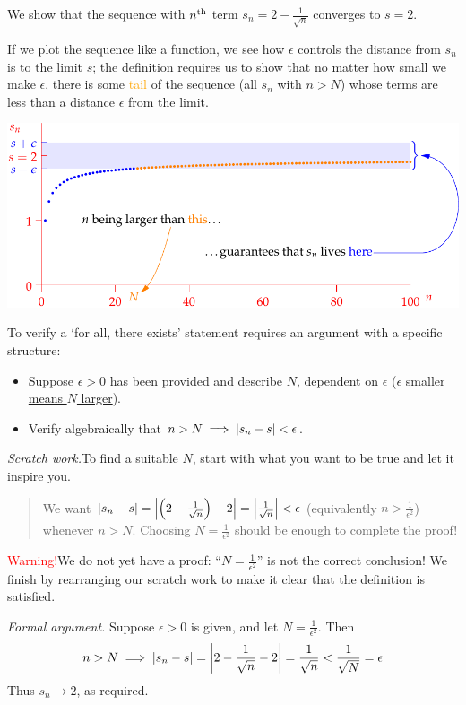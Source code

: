 \goodbreak


\begin{example}{}{}
We show that the sequence with $n\textsuperscript{th}$ term $s_n=2-\frac 1{\sqrt n}$ converges to $s=2$.\smallbreak

If we plot the sequence like a function, we see how $\epsilon$ controls the distance from $s_n$ is to the limit $s$; the definition requires us to show that no matter how small we make $\epsilon$, there is some \textcolor{orange}{tail} of the sequence (all $s_n$ with $n>N$) whose terms are less than a distance $\epsilon$ from the limit.\vspace{-5pt}

\begin{center}
\includegraphics[scale=0.9]{limitdef-pic}\vspace{-8pt}
\end{center}

To verify a `for all, there exists' statement requires an argument with a specific structure:
\begin{itemize}\itemsep0pt
  \item Suppose $\epsilon>0$ has been provided and describe $N$, dependent on $\epsilon$ (\href{http://www.math.uci.edu/~ndonalds/math140a/limitdefanim.html}{$\epsilon$ smaller means $N$ larger}).
  \item Verify algebraically that $n>N\implies\left| s_n-s\right|<\epsilon$.
\end{itemize}

\emph{Scratch work.}\quad To find a suitable $N$, start with what you want to be true and let it inspire you.
\begin{quote}
We want $\left| s_n-s\right|=\left| \left(2-\frac 1{\sqrt n}\right)-2\right| =\left| \frac 1{\sqrt n}\right|<\epsilon$ (equivalently $n>\frac 1{\epsilon^2}$) whenever $n>N$. Choosing $N=\frac 1{\epsilon^2}$ should be enough to complete the proof!
\end{quote}
\textcolor{red}{Warning!}\quad We do not yet have a proof: ``$N=\frac 1{\epsilon^2}$'' is not the correct conclusion! We finish by rearranging our scratch work to make it clear that the definition is satisfied.\medbreak

\emph{Formal argument.}\quad
Suppose $\epsilon>0$ is given, and let $N=\frac 1{\epsilon^2}$. Then
\[
n>N\implies \left| s_n-s\right|=\left| 2-\frac 1{\sqrt n}-2\right| =\frac 1{\sqrt n}<\frac 1{\sqrt N}=\epsilon
\]
Thus $s_n\to 2$, as required.
\end{example}

